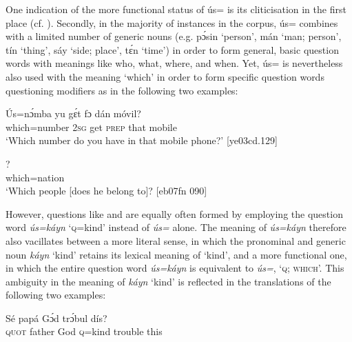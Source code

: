 One indication of the more functional status of ús= is its cliticisation in the first place (cf. ). Secondly, in the majority of instances in the corpus, ús= combines with a limited number of generic nouns (e.g. pɔ́sin ‘person’, mán ‘man; person’, tín ‘thing’, sáy ‘side; place’, tɛ́n ‘time’) in order to form general, basic question words with meanings like who, what, where, and when. Yet, ús= is nevertheless also used with the meaning ‘which’ in order to form specific question words questioning modifiers as in the following two examples: 


\ea%
    \label{ex:key:616}
    \gll \'{U}s=nɔ́mba    yu  gɛ́t  fɔ  dán  móvil?\\
which=number  \textsc{2sg}  get  \textsc{prep}  that  mobile\\

\glt ‘Which number do you have in that mobile phone?’ [ye03cd.129]
\z


\ea%
    \label{ex:key:617}
    \gll {}?\\
which=nation\\

\glt ‘Which people [does he belong to]? [eb07fn 090]
\z

However, questions like  and  are equally often formed by employing the question word \textit{ús=káyn} ‘\textsc{q}=kind’ instead of \textit{ús=} alone. The meaning of \textit{ús=káyn} therefore also vacillates between a more literal sense, in which the pronominal and generic noun \textit{káyn} ‘kind’ retains its lexical meaning of ‘kind’, and a more functional one, in which the entire question word \textit{ús=káyn} is equivalent to \textit{ús=}, ‘\textsc{q;} \textsc{which’.} This ambiguity in the meaning of \textit{káyn} ‘kind’ is reflected in the translations of the following two examples:


\ea%
    \label{ex:key:618}
\z
\z


\ea%
    \label{ex:key:619}
    \gll Sé    papá  Gɔ́d    trɔ́bul  dís?\\
\textsc{quot}    father  God  \textsc{q}=kind  trouble  this\\

